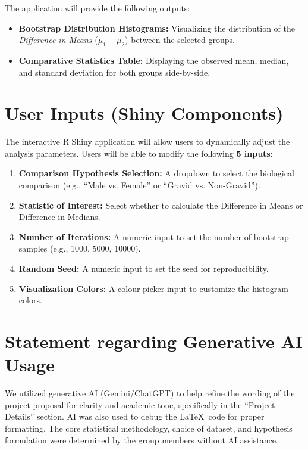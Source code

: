 \documentclass{article}
\begin{document}
    \noindent The application will provide the following outputs:
    \begin{itemize}
        \item \textbf{Bootstrap Distribution Histograms:} Visualizing the distribution of the \textit{Difference in Means} ($\mu_1 - \mu_2$) between the selected groups.
        \item \textbf{Comparative Statistics Table:} Displaying the observed mean, median, and standard deviation for both groups side-by-side.
    \end{itemize}

    \section{User Inputs (Shiny Components)}
    The interactive R Shiny application will allow users to dynamically adjust the analysis parameters. Users will be able to modify the following \textbf{5 inputs}:
    
    \begin{enumerate}
        \item \textbf{Comparison Hypothesis Selection:} A dropdown to select the biological comparison (e.g., ``Male vs. Female'' or ``Gravid vs. Non-Gravid'').
        \item \textbf{Statistic of Interest:} Select whether to calculate the Difference in Means or Difference in Medians.
        \item \textbf{Number of Iterations:} A numeric input to set the number of bootstrap samples (e.g., 1000, 5000, 10000).
        \item \textbf{Random Seed:} A numeric input to set the seed for reproducibility.
        \item \textbf{Visualization Colors:} A colour picker input to customize the histogram colors.
    \end{enumerate}

    \section{Statement regarding Generative AI Usage}
    We utilized generative AI (Gemini/ChatGPT) to help refine the wording of the project proposal for clarity and academic tone, specifically in the ``Project Details'' section. AI was also used to debug the \LaTeX\ code for proper formatting. The core statistical methodology, choice of dataset, and hypothesis formulation were determined by the group members without AI assistance.

\nocite{*} 


\end{document}
